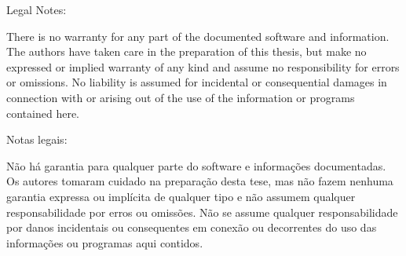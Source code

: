 

\ifenglish
    Legal Notes:

    There is no warranty for any part of the documented software and information. The authors have taken care in the
    preparation of this thesis, but make no expressed or implied warranty of any kind and assume no
    responsibility for errors or omissions. No liability is assumed for incidental or consequential
    damages in connection with or arising out of the use of the information or programs contained here.

\else

    Notas legais:

    Não há garantia para qualquer parte do software e informações documentadas. Os autores tomaram cuidado na
    preparação desta tese, mas não fazem nenhuma garantia expressa ou implícita de qualquer tipo e não
    assumem qualquer responsabilidade por erros ou omissões. Não se assume qualquer responsabilidade por
    danos incidentais ou consequentes em conexão ou decorrentes do uso das informações ou programas aqui
    contidos.

\fi


